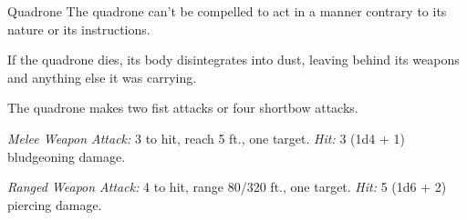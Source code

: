 \documentclass[10pt,a4paper,twoside,bg=print,twocolumn,openany,nodeprecatedcode]{dndbook}
\begin{document}
\begin{DndMonster}[float=t]{Quadrone}
\DndMonsterBasics[
armor-class = {16 (natural armor)},
hit-points = {\DndDice{4d8 + 4}},
speed = {30 ft., fly 30 ft.}
]
\DndMonsterAbilityScores[
 str = 12,
 dex = 14,
 con = 12,
 int = 10,
 wis = 10,
 cha = 11
]
\DndMonsterDetails[
skills = {Perception +2},
senses = {truesight 120 ft., passive perception 12},
languages = {Modron},
challenge = 1,
]
The quadrone can't be compelled to act in a manner contrary to its nature or its instructions.

If the quadrone dies, its body disintegrates into dust, leaving behind its weapons and anything else it was carrying.

The quadrone makes two fist attacks or four shortbow attacks.

\textsl{Melee Weapon Attack:} 3 to hit, reach 5 ft., one target. \textsl{Hit:} 3 (1d4 + 1) bludgeoning damage.

\textsl{Ranged Weapon Attack:} 4 to hit, range 80/320 ft., one target. \textsl{Hit:} 5 (1d6 + 2) piercing damage.

\end{DndMonster}
\end{document}
